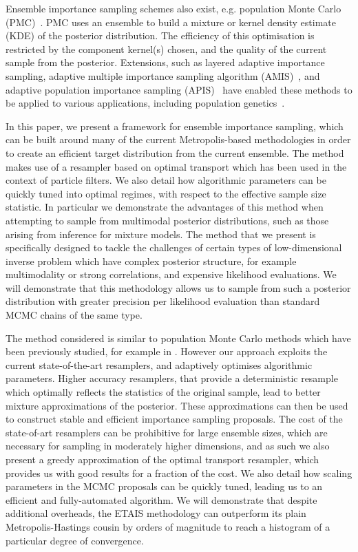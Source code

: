 \documentclass[final]{siamltex}
\newcommand{\revised}{}
\begin{document}
Ensemble importance sampling schemes also exist, e.g. population Monte Carlo (PMC)~\cite{cappe2012population}. PMC uses an ensemble to build a mixture or kernel density estimate (KDE) of the
posterior distribution. The efficiency of
this optimisation is restricted by the component kernel(s) chosen, and
the quality of the current sample from the posterior\cite{cappe2008adaptive,douc2007convergence,douc2007minimum}. Extensions, such
as layered adaptive importance sampling\cite{martino2017layered}, adaptive multiple importance sampling algorithm
(AMIS)~\cite{cornuet2012adaptive}, and adaptive population importance sampling
(APIS)~\cite{martino2015adaptive} have enabled these methods to be
applied to various applications, including population
genetics~\cite{siren2011reconstructing}.

{\revised In this paper, we present a framework for ensemble
importance sampling, which can be built around many of the current
Metropolis-based methodologies in order to create an efficient target
distribution from the current
ensemble.} The method makes use of a resampler based on optimal
transport which has been used in the context of particle
filters\cite{reich2013nonparametric}. We also detail how algorithmic
parameters can be quickly tuned into optimal regimes, with respect to
the effective sample size statistic. In particular we demonstrate the
advantages of this method when attempting to sample from multimodal
posterior distributions, such as those arising from inference for
mixture models. The method that we present is specifically designed to
tackle the challenges of certain types of low-dimensional inverse
problem which have complex posterior structure, for example
multimodality or strong correlations, and expensive
likelihood evaluations. We will demonstrate that this methodology
allows us to sample from such a posterior distribution with greater
precision per likelihood evaluation than 
standard MCMC chains of the same type.

The method considered is similar to population Monte Carlo methods
which have been previously studied, for example in
\cite{elvira2017improving}. However our approach exploits the current
state-of-the-art resamplers, and adaptively optimises algorithmic parameters. Higher accuracy resamplers, that provide
a deterministic resample which optimally reflects the statistics of
the original sample, lead to better mixture approximations of the
posterior. These approximations can then be used to construct stable
and efficient importance sampling proposals. The cost of the
state-of-art resamplers can be prohibitive for large ensemble sizes,
which are necessary for sampling in moderately higher dimensions, and
as such we also present a greedy approximation of the optimal
transport resampler, which provides us with good results for a
fraction of the cost. We also detail how scaling parameters in the
MCMC proposals can be quickly tuned, leading us to an efficient and
fully-automated algorithm. We will demonstrate that despite additional
overheads, the ETAIS methodology can outperform its plain
Metropolis-Hastings cousin by orders of magnitude to reach a histogram
of a particular degree of convergence.
\end{document}

